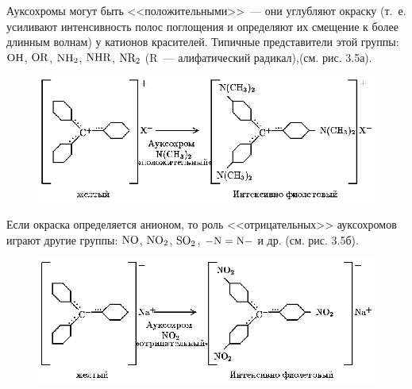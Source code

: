 Ауксохромы могут быть <<положительными>>\ --- они углубляют
окраску (т.~е. усиливают интенсивность полос поглощения и
определяют их смещение к более длинным волнам) у катионов
красителей. Типичные представители этой группы: $\rm OH$, $\rm
OR$, $\rm NH_2$, $\rm NHR$, $\rm NR_2$ (R~--- алифатический
радикал),\linebreak (см. рис. 3.5а).
\begin{figure}[tbp]
\centerline{\hbox{\includegraphics[scale=0.9]{Ris/ris_eps/ris3_05b.eps}}}
\end{figure}

Если окраска определяется анионом, то
роль <<отрицательных>> ауксохромов играют другие группы: $\rm
NO$, $\rm NO_2$, $\rm SO_2$, $\rm -N=N-$ и др. (см. рис. 3.5б).

\begin{figure}[tbp]
\centerline{\hbox{\includegraphics[scale=0.9]{Ris/ris_eps/ris3_05c.eps}}}
\end{figure}


